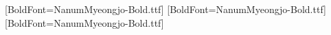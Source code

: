 \usepackage{kotex}
[BoldFont=NanumMyeongjo-Bold.ttf]
[BoldFont=NanumMyeongjo-Bold.ttf]
[BoldFont=NanumMyeongjo-Bold.ttf]
\usepackage{titlesec}
\newcommand{\snuchapterformat}{\chaptername\ \thechapter}
\titleformat{\chapter}[display]{\normalfont\bfseries\fontsize{16}{22}\selectfont}{\snuchapterformat}{8pt}{}
\titlespacing*{\chapter}{0pt}{0pt}{24pt}
\titleformat{\section}{\normalfont\bfseries\fontsize{14}{20}\selectfont}{\thesection}{1em}{}
\titleformat{\subsection}{\normalfont\bfseries\fontsize{12}{18}\selectfont}{\thesubsection}{1em}{}
\setlength{\parindent}{1em}
\setlength{\parskip}{0pt}
\pagestyle{plain}
\raggedbottom
\newenvironment{snucover}{\clearpage\thispagestyle{empty}\begingroup\centering\setstretch{1.15}}{\par\endgroup\clearpage}
\newcommand{\snutitle}[1]{{\bfseries\fontsize{22}{28}\selectfont #1\par}}
\newcommand{\snusubtitle}[1]{{\fontsize{16}{22}\selectfont #1\par}}
\newcommand{\snuabstractmeta}[1]{{\fontsize{11}{16}\selectfont #1\par}}
\newcommand{\snumeta}[1]{{\fontsize{14}{20}\selectfont #1\par}}
\newcommand{\snucommittee}[3]{#1 & \makebox[5cm][c]{#2} & #3 \\[0.45cm]}
